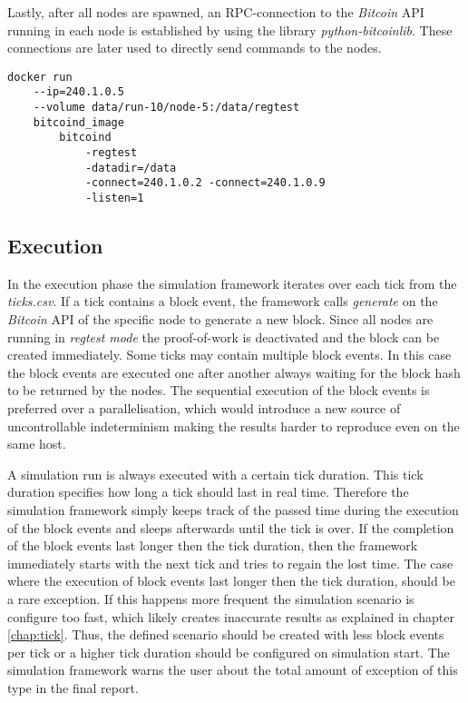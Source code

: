 Lastly, after all nodes are spawned, an RPC-connection to the \textit{Bitcoin} API running in each node is established by using the library \textit{python-bitcoinlib}.
These connections are later used to directly send commands to the nodes.

\begin{minipage}{\linewidth}
\begin{lstlisting}[caption=Simplified version of how a node is started with \textit{Docker} and \textit{bitcoind}, label={lst:docker_create}, basicstyle=\ttfamily, captionpos=b]
docker run
	--ip=240.1.0.5
	--volume data/run-10/node-5:/data/regtest
	bitcoind_image
		bitcoind
			-regtest
			-datadir=/data
			-connect=240.1.0.2 -connect=240.1.0.9
			-listen=1
\end{lstlisting}
\end{minipage}
	
\subsection{Execution}
\label{chap:simulation_execution}

In the execution phase the simulation framework iterates over each tick from the \textit{ticks.csv}.
If a tick contains a block event, the framework calls \textit{generate} on the \textit{Bitcoin} API of the specific node to generate a new block.
Since all nodes are running in \textit{regtest mode} the proof-of-work is deactivated and the block can be created immediately.
Some ticks may contain multiple block events.
In this case the block events are executed one after another always waiting for the block hash to be returned by the nodes.
The sequential execution of the block events is preferred over a parallelisation, which would introduce a new source of uncontrollable indeterminism making the results harder to reproduce even on the same host.

A simulation run is always executed with a certain tick duration.
This tick duration specifies how long a tick should last in real time.
Therefore the simulation framework simply keeps track of the passed time during the execution of the block events and sleeps afterwards until the tick is over.
If the completion of the block events last longer then the tick duration, then the framework immediately starts with the next tick and tries to regain the lost time.
The case where the execution of block events last longer then the tick duration, should be a rare exception.
If this happens more frequent the simulation scenario is configure too fast, which likely creates inaccurate results as explained in chapter \ref{chap:tick}.
Thus, the defined scenario should be created with less block events per tick or a higher tick duration should be configured on simulation start.
The simulation framework warns the user about the total amount of exception of this type in the final report.

